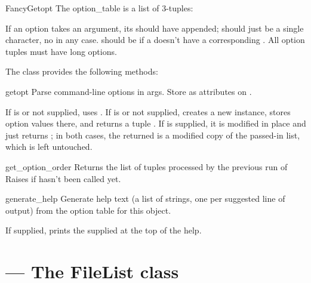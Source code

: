 \documentclass{manual}
\begin{document}
\begin{classdesc}{FancyGetopt}{}
The option_table is a list of 3-tuples: 

If an option takes an argument, its  should have 
appended;  should just be a single character, no 
in any case.  should be  if a  
doesn't have a corresponding . All option tuples must have
long options.
\end{classdesc}

The  class provides the following methods:

\begin{methoddesc}{getopt}{}
Parse command-line options in args. Store as attributes on .

If  is  or not supplied, uses .  If
 is  or not supplied, creates a new 
instance, stores option values there, and returns a tuple .  If  is supplied, it is modified in place and
 just returns ; in both cases, the returned
 is a modified copy of the passed-in  list, which
is left untouched.
\end{methoddesc}

\begin{methoddesc}{get_option_order}{}
Returns the list of  tuples processed by the
previous run of   Raises  if
 hasn't been called yet.
\end{methoddesc}

\begin{methoddesc}{generate_help}{}
Generate help text (a list of strings, one per suggested line of
output) from the option table for this  object.

If supplied, prints the supplied  at the top of the help.
\end{methoddesc}

\section{ --- The FileList class}
\end{document}
